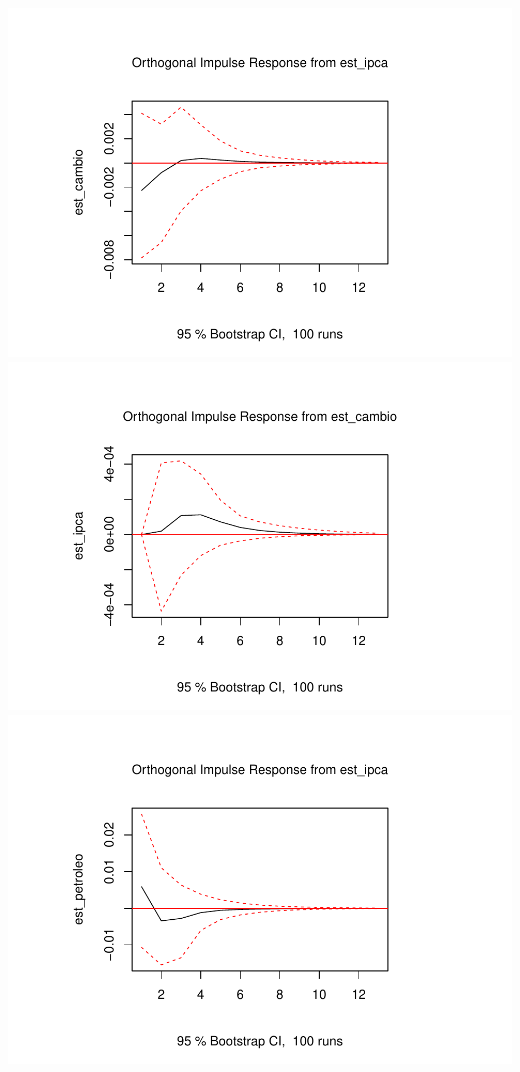 \documentclass[12pt]{article}
\begin{document}
\includegraphics{article_files/figure-latex/unnamed-chunk-14-1.pdf}
\includegraphics{article_files/figure-latex/unnamed-chunk-14-2.pdf}
\includegraphics{article_files/figure-latex/unnamed-chunk-14-3.pdf}
\end{document}
